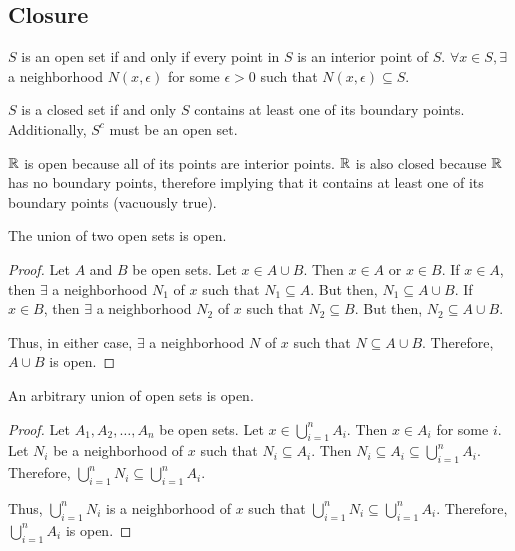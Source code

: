\subsection{Closure}
\begin{definition}
    $S$ is an open set if and only if every point in $S$ is an interior point of $S$. $\forall x \in S, \exists$ a neighborhood $N(x, \epsilon)$ for some $\epsilon > 0$ such that $N(x, \epsilon) \subseteq S$.
\end{definition}

\begin{definition}
    $S$ is a closed set if and only $S$ contains at least one of its boundary points. Additionally, $S^c$ must be an open set.
\end{definition}

\begin{remark}[Closure of $\R$]
    $\R$ is open because all of its points are interior points. $\R$ is also closed because $\R$ has no boundary points, therefore implying that it contains at least one of its boundary points (vacuously true).
\end{remark}

\begin{theorem}
    The union of two open sets is open.
\end{theorem}
\begin{proof}
    Let $A$ and $B$ be open sets. Let $x \in A \cup B$. Then $x \in A$ or $x \in B$. If $x \in A$, then $\exists$ a neighborhood $N_1$ of $x$ such that $N_1 \subseteq A$. But then, $N_1 \subseteq A \cup B$. If $x \in B$, then $\exists$ a neighborhood $N_2$ of $x$ such that $N_2 \subseteq B$. But then, $N_2 \subseteq A \cup B$. 
    
    Thus, in either case, $\exists$ a neighborhood $N$ of $x$ such that $N \subseteq A \cup B$. Therefore, $A \cup B$ is open.
\end{proof}

\begin{theorem}
    An arbitrary union of open sets is open.
\end{theorem}
\begin{proof}
    Let $A_1, A_2, \ldots, A_n$ be open sets. Let $x \in \bigcup_{i=1}^n A_i$. Then $x \in A_i$ for some $i$. Let $N_i$ be a neighborhood of $x$ such that $N_i \subseteq A_i$. Then $N_i \subseteq A_i \subseteq \bigcup_{i=1}^n A_i$. Therefore, $\bigcup_{i=1}^n N_i \subseteq \bigcup_{i=1}^n A_i$. 
    
    Thus, $\bigcup_{i=1}^n N_i$ is a neighborhood of $x$ such that $\bigcup_{i=1}^n N_i \subseteq \bigcup_{i=1}^n A_i$. Therefore, $\bigcup_{i=1}^n A_i$ is open.
\end{proof}

